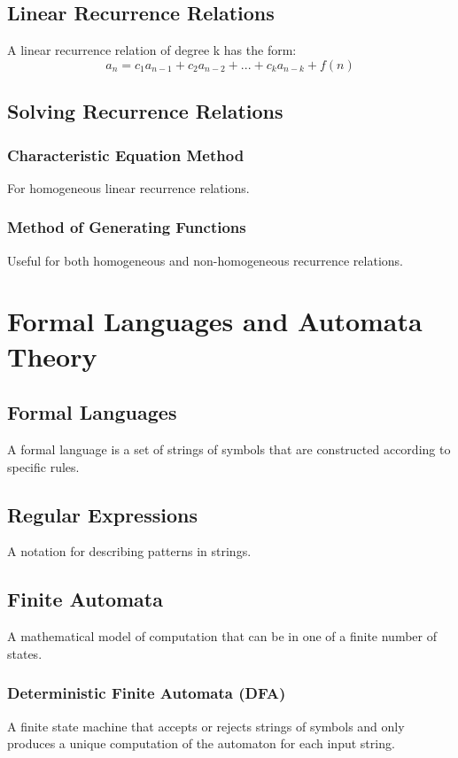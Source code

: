 \documentclass{article}
\begin{document}
\subsection{Linear Recurrence Relations}
A linear recurrence relation of degree k has the form:
$$a_n = c_1a_{n-1} + c_2a_{n-2} + ... + c_ka_{n-k} + f(n)$$

\subsection{Solving Recurrence Relations}

\subsubsection{Characteristic Equation Method}
For homogeneous linear recurrence relations.

\subsubsection{Method of Generating Functions}
Useful for both homogeneous and non-homogeneous recurrence relations.

\section{Formal Languages and Automata Theory}

\subsection{Formal Languages}
A formal language is a set of strings of symbols that are constructed according to specific rules.

\subsection{Regular Expressions}
A notation for describing patterns in strings.

\subsection{Finite Automata}
A mathematical model of computation that can be in one of a finite number of states.

\subsubsection{Deterministic Finite Automata (DFA)}
A finite state machine that accepts or rejects strings of symbols and only produces a unique computation of the automaton for each input string.
\end{document}
